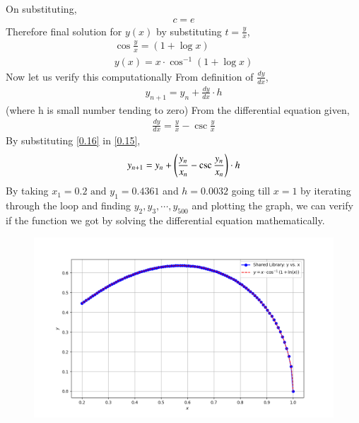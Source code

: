 \documentclass[journal]{IEEEtran}
\begin{document}
On substituting, 
\begin{align}
    c = e
\end{align}
Therefore final solution for $y(x)$ by substituting $t=\frac{y}{x}$, 
\begin{align}
    \cos \frac{y}{x} = (1 + \log x)\\  
    y(x) = x \cdot \cos^{-1}(1+\log x)
\end{align}
Now let us verify this computationally
From definition of $\frac{dy}{dx}$,
\begin{align}
    y_{n+1}=y_{n}+\frac{dy}{dx}\cdot h
    \label{0.15}
\end{align}
(where h is small number tending to zero)
From the differential equation given,
\begin{align}
    \frac{dy}{dx}=\frac{y}{x} - \csc \frac{y}{x}
    \label{0.16}
\end{align}
By substituting \ref{0.16} in \ref{0.15},
\begin{align}
    y_{n+1}=y_{n}+\left(\frac{y_n}{x_n} - \csc \frac{y_n}{x_n}\right)\cdot h
\end{align}
By taking $x_1=0.2 \text{ and } y_1=0.4361$  and $h=0.0032$ going till $x=1$ by iterating through the loop and finding $y_2,y_3,\cdots , y_{500}$ and plotting the graph, we can verify if the function we got by solving the differential equation mathematically.\\
\begin{figure}[H]
    \centering
    \includegraphics[width = \columnwidth]{figs/Figure_1.png}
\end{figure}
\end{document}
